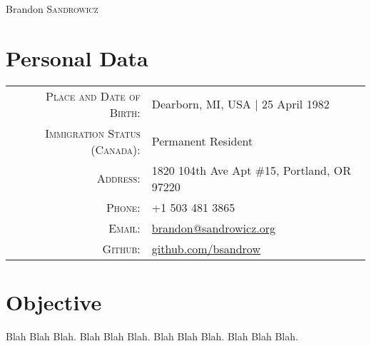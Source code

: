 \documentclass[a4paper,10pt]{article}
\begin{document}
\pagestyle{empty} %

\par{\centering
    {\Huge Brandon \textsc{Sandrowicz} }
    \bigskip\par}

\section{Personal Data}
\begin{tabular}{rl}
\textsc{Place and Date of Birth:}       & Dearborn, MI, USA | 25 April 1982\\
\textsc{Immigration Status (Canada):}   & Permanent Resident\\
\textsc{Address:}                       & 1820 104th Ave Apt \#15, Portland, OR 97220\\
\textsc{Phone:}                         & +1 503 481 3865\\
\textsc{Email:}                         & \href{mailto:brandon@sandrowicz.org}{brandon@sandrowicz.org}\\
\textsc{Github:}                        & \href{http://github.com/bsandrow}{github.com/bsandrow}\\
\end{tabular}

\section{Objective}
Blah Blah Blah. Blah Blah Blah. Blah Blah Blah. Blah Blah Blah.

\end{document}
